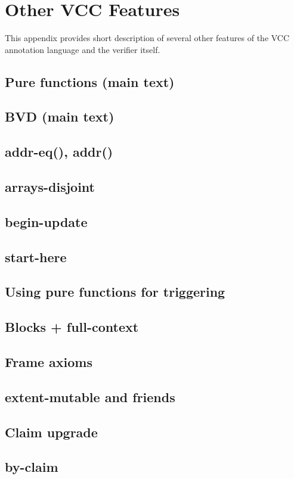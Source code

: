 \section{Other VCC Features}

This appendix provides short description of several other
features of the VCC annotation language and the verifier itself.

\subsection{Pure functions (main text)}
\subsection{BVD (main text)}
\subsection{addr-eq(), addr()}
\subsection{arrays-disjoint}
\subsection{begin-update}
\subsection{start-here}
\subsection{Using pure functions for triggering}
\subsection{Blocks +  full-context}
\subsection{Frame axioms}
\subsection{extent-mutable and friends}
\subsection{Claim upgrade}
\subsection{by-claim}
